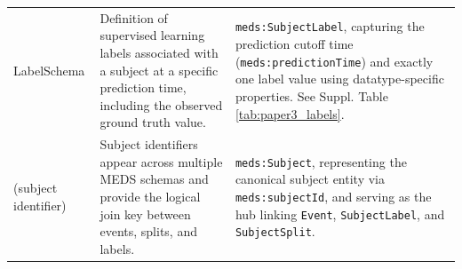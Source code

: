 \begin{table}[htbp]
\begin{tabularx}{\textwidth}{>{\raggedright\arraybackslash}p{} >{\raggedright\arraybackslash}X >{\raggedright\arraybackslash}X}
		LabelSchema &
		Definition of supervised learning labels associated with a subject at a specific prediction time, including the observed ground truth value. &
		\texttt{meds:SubjectLabel}, capturing the prediction cutoff time (\texttt{meds:predictionTime}) and exactly one label value using datatype-specific properties.  
		See Suppl. Table \ref{tab:paper3_labels}. \\[4pt] %
		
		(subject identifier) &
		Subject identifiers appear across multiple MEDS schemas and provide the logical join key between events, splits, and labels. &
		\texttt{meds:Subject}, representing the canonical subject entity via \texttt{meds:subjectId}, and serving as the hub linking \texttt{Event}, \texttt{SubjectLabel}, and \texttt{SubjectSplit}. \\
		
		\bottomrule
\end{tabularx}
\end{table}


